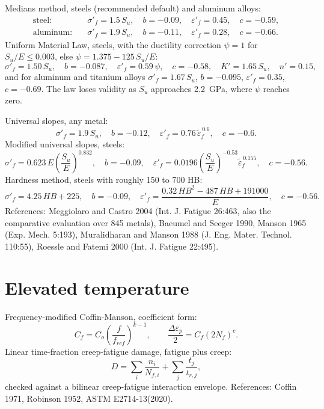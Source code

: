 \documentclass[11pt]{article}
\begin{document}
Medians method, steels (recommended default) and aluminum alloys:
\begin{equation}
\begin{aligned}
\text{steel:} &\quad \sigma'_f = 1.5\,S_u, \quad b=-0.09, \quad \varepsilon'_f = 0.45, \quad c=-0.59,\\
\text{aluminum:} &\quad \sigma'_f = 1.9\,S_u, \quad b=-0.11, \quad \varepsilon'_f = 0.28, \quad c=-0.66.
\end{aligned}
\end{equation}
Uniform Material Law, steels, with the ductility correction
\(\psi = 1\) for \(S_u/E \le 0.003\), else \(\psi = 1.375 - 125\,S_u/E\):
\begin{equation}
\sigma'_f = 1.50\,S_u, \quad b=-0.087, \quad \varepsilon'_f = 0.59\,\psi,
\quad c=-0.58, \quad K' = 1.65\,S_u, \quad n' = 0.15,
\end{equation}
and for aluminum and titanium alloys
\(\sigma'_f = 1.67\,S_u\), \(b=-0.095\), \(\varepsilon'_f = 0.35\),
\(c=-0.69\). The law loses validity as \(S_u\) approaches \SI{2.2}{\giga\pascal},
where \(\psi\) reaches zero.

Universal slopes, any metal:
\begin{equation}
\sigma'_f = 1.9\,S_u, \quad b=-0.12, \quad
\varepsilon'_f = 0.76\,\tilde\varepsilon_f^{\,0.6}, \quad c=-0.6.
\end{equation}
Modified universal slopes, steels:
\begin{equation}
\sigma'_f = 0.623\,E\left(\frac{S_u}{E}\right)^{0.832}, \quad b=-0.09, \quad
\varepsilon'_f = 0.0196\left(\frac{S_u}{E}\right)^{-0.53}\tilde\varepsilon_f^{\,0.155},
\quad c=-0.56.
\end{equation}
Hardness method, steels with roughly 150 to 700 HB:
\begin{equation}
\sigma'_f = 4.25\,HB + 225, \quad b=-0.09, \quad
\varepsilon'_f = \frac{0.32\,HB^2 - 487\,HB + 191000}{E}, \quad c=-0.56.
\end{equation}
References: Meggiolaro and Castro 2004 (Int. J. Fatigue 26:463, also the
comparative evaluation over 845 metals), Baeumel and Seeger 1990, Manson 1965
(Exp. Mech. 5:193), Muralidharan and Manson 1988 (J. Eng. Mater. Technol.
110:55), Roessle and Fatemi 2000 (Int. J. Fatigue 22:495).

\section{Elevated temperature}
Frequency-modified Coffin-Manson, coefficient form:
\begin{equation}
C_f = C_o\left(\frac{f}{f_{ref}}\right)^{k-1},
\qquad
\frac{\Delta\varepsilon_p}{2} = C_f (2N_f)^{c}.
\end{equation}
Linear time-fraction creep-fatigue damage, fatigue plus creep:
\begin{equation}
D = \sum_i \frac{n_i}{N_{f,i}} + \sum_j \frac{t_j}{t_{r,j}},
\end{equation}
checked against a bilinear creep-fatigue interaction envelope. References: Coffin
1971, Robinson 1952, ASTM E2714-13(2020).
\end{document}
